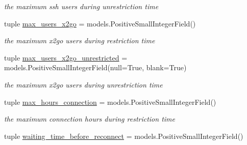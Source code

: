 \begin{DoxyCompactItemize}
\begin{DoxyCompactList}\small\item\em the maximum ssh users during unrestriction time \end{DoxyCompactList}\item 
\hypertarget{classrestriction__system_1_1models_1_1Workstation_ade0c4ffd464ed0743170aa3626513206}{}tuple \hyperlink{classrestriction__system_1_1models_1_1Workstation_ade0c4ffd464ed0743170aa3626513206}{max\+\_\+users\+\_\+x2go} = models.\+Positive\+Small\+Integer\+Field()\label{classrestriction__system_1_1models_1_1Workstation_ade0c4ffd464ed0743170aa3626513206}

\begin{DoxyCompactList}\small\item\em the maximum x2go users during restriction time \end{DoxyCompactList}\item 
\hypertarget{classrestriction__system_1_1models_1_1Workstation_aef61f678235afaaff2feada648a2b1ef}{}tuple \hyperlink{classrestriction__system_1_1models_1_1Workstation_aef61f678235afaaff2feada648a2b1ef}{max\+\_\+users\+\_\+x2go\+\_\+unrestricted} = models.\+Positive\+Small\+Integer\+Field(null=True, blank=True)\label{classrestriction__system_1_1models_1_1Workstation_aef61f678235afaaff2feada648a2b1ef}

\begin{DoxyCompactList}\small\item\em the maximum x2go users during unrestriction time \end{DoxyCompactList}\item 
\hypertarget{classrestriction__system_1_1models_1_1Workstation_a29ed30562c8f0598b983ed26af516b49}{}tuple \hyperlink{classrestriction__system_1_1models_1_1Workstation_a29ed30562c8f0598b983ed26af516b49}{max\+\_\+hours\+\_\+connection} = models.\+Positive\+Small\+Integer\+Field()\label{classrestriction__system_1_1models_1_1Workstation_a29ed30562c8f0598b983ed26af516b49}

\begin{DoxyCompactList}\small\item\em the maximum connection hours during restriction time \end{DoxyCompactList}\item 
\hypertarget{classrestriction__system_1_1models_1_1Workstation_a73b8c2dadad98984d744778e93aea8a0}{}tuple \hyperlink{classrestriction__system_1_1models_1_1Workstation_a73b8c2dadad98984d744778e93aea8a0}{waiting\+\_\+time\+\_\+before\+\_\+reconnect} = models.\+Positive\+Small\+Integer\+Field()\label{classrestriction__system_1_1models_1_1Workstation_a73b8c2dadad98984d744778e93aea8a0}


\end{DoxyCompactItemize}
